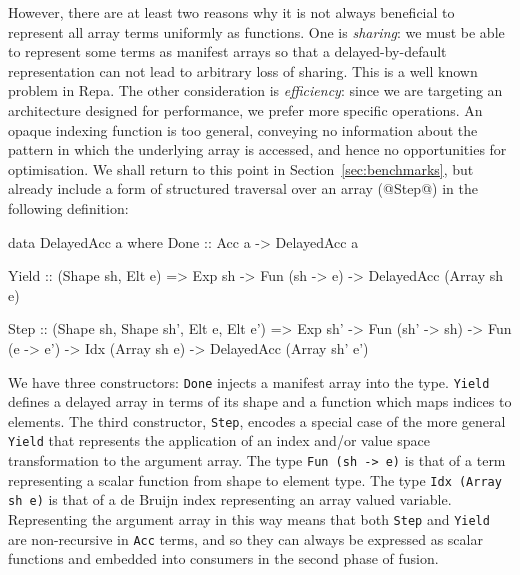 However, there are at least two reasons why it is not always beneficial to represent all array terms uniformly as functions. One is \emph{sharing}: we must be able to represent some terms as manifest arrays so that a delayed-by-default representation can not lead to arbitrary loss of sharing. This is a well known problem in Repa. The other consideration is \emph{efficiency}: since we are targeting an architecture designed for performance, we prefer more specific operations. An opaque indexing function is too general, conveying no information about the pattern in which the underlying array is accessed, and hence no opportunities for optimisation. We shall return to this point in Section~\ref{sec:benchmarks}, but already include a form of structured traversal over an array (@Step@) in the following definition:

\begin{code}
  data DelayedAcc a where
    Done  :: Acc a
          -> DelayedAcc a

    Yield :: (Shape sh, Elt e)
          => Exp sh
          -> Fun (sh -> e)
          -> DelayedAcc (Array sh e)

    Step  :: (Shape sh, Shape sh', Elt e, Elt e')
          => Exp sh'
          -> Fun (sh' -> sh)
          -> Fun (e -> e')
          -> Idx (Array sh e)
          -> DelayedAcc (Array sh' e')
\end{code}
%
We have three constructors: \texttt{Done} injects a manifest array into the
type. \texttt{Yield} defines a delayed array in terms of its shape and a
function which maps indices to elements. The third constructor, \texttt{Step},
encodes a special case of the more general \texttt{Yield} that represents the
application of an index and/or value space transformation to the argument array.
The type \texttt{Fun (sh -> e)} is that of a term representing a scalar
function from shape to element type. The type \texttt{Idx (Array sh e)} is that of a de
Bruijn index representing an array valued variable. Representing the argument
array in this way means that both \texttt{Step} and \texttt{Yield} are
non-recursive in \texttt{Acc} terms, and so they can always be expressed as
scalar functions and embedded into consumers in the second phase of fusion.

